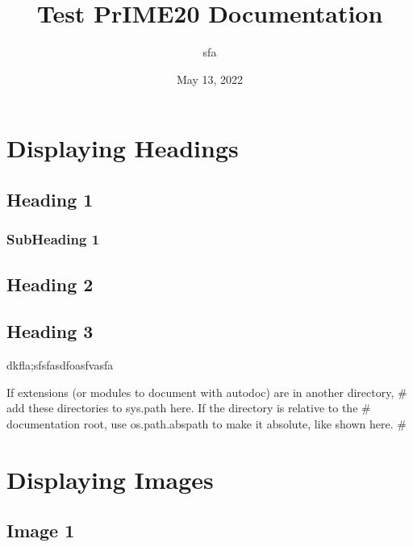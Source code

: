 \documentclass[letterpaper,10pt,english]{sphinxmanual}
\title{Test PrIME20 Documentation}
\date{May 13, 2022}
\author{sfa}
\begin{document}
\pagestyle{empty}
\sphinxmaketitle
\pagestyle{plain}
\sphinxtableofcontents
\pagestyle{normal}
\label{\detokenize{index::doc}}


\sphinxstepscope


\chapter{Displaying Headings}
\label{\detokenize{topic1:displaying-headings}}\label{\detokenize{topic1::doc}}

\section{Heading 1}
\label{\detokenize{topic1:heading-1}}

\subsection{Sub\sphinxhyphen{}Heading 1}
\label{\detokenize{topic1:sub-heading-1}}

\section{Heading 2}
\label{\detokenize{topic1:heading-2}}

\section{Heading 3}
\label{\detokenize{topic1:heading-3}}
\sphinxAtStartPar
dkfla;sfsfasdfoasfvasfa

\sphinxAtStartPar
If extensions (or modules to document with autodoc) are in another directory,
\# add these directories to sys.path here. If the directory is relative to the
\# documentation root, use os.path.abspath to make it absolute, like shown here.
\#

\sphinxstepscope


\chapter{Displaying Images}
\label{\detokenize{topic2:displaying-images}}\label{\detokenize{topic2::doc}}

\section{Image 1}
\label{\detokenize{topic2:image-1}}
\noindent{}
\end{document}
